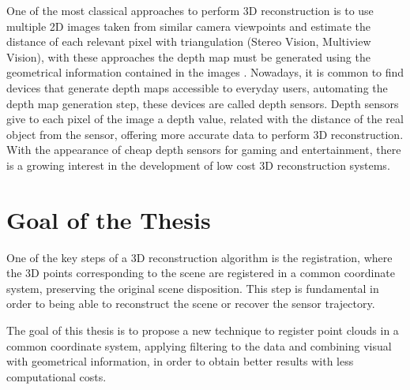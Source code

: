 One of the most classical approaches to perform 3D reconstruction is to use multiple 2D
 images taken from similar camera viewpoints and estimate the distance of each
 relevant pixel with triangulation (Stereo Vision, Multiview Vision), with these 
approaches the depth map must be generated using the geometrical information contained
 in the images \cite{Newcombe10livedense}. Nowadays, it is common to find devices that generate depth maps accessible
 to everyday users, automating the depth map generation step, these devices are called depth sensors. 
Depth sensors give to each pixel of the image a depth value, related
with the distance of the real object from the sensor, offering  more
accurate data to perform 3D reconstruction. With the appearance
of cheap depth sensors for gaming and entertainment, there is a growing interest in the development of low cost
3D reconstruction systems. 


\section{Goal of the Thesis} 

One of the key steps of a 3D reconstruction algorithm is the registration, where the 3D points corresponding to
 the scene are  registered in a common coordinate system, preserving the original scene disposition. This step is 
 fundamental in order to being able to reconstruct the scene or recover the sensor trajectory.

The goal of this thesis is to propose a new technique to register point clouds in a common coordinate system, applying 
filtering to the data and combining visual with geometrical information, in order to obtain better results with less 
computational costs. 





